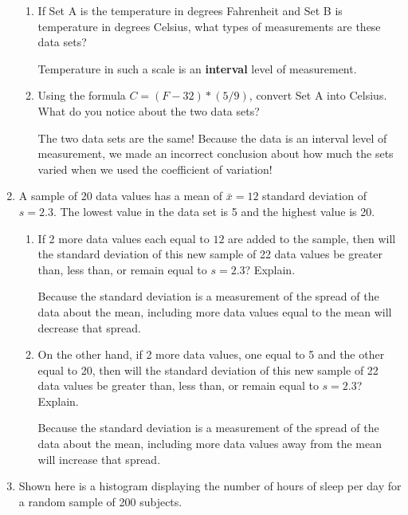 \documentclass{article}
\newcommand{\answer}[1]{\color{white}#1}
\begin{document}
\begin{enumerate}
\begin{enumerate}
    \item If Set A is the temperature in degrees Fahrenheit and Set B is temperature in degrees Celsius, what types of measurements are these data sets?
    
    {\answer Temperature in such a scale is an \textbf{interval} level of measurement.}
    
    \item Using the formula $C = (F-32) * (5/9)$, convert Set A into Celsius. What do you notice about the two data sets?
    
    {\answer The two data sets are the same! Because the data is an interval level of measurement, we made an incorrect conclusion about how much the sets varied when we used the coefficient of variation!}
    \end{enumerate}

\item A sample of 20 data values has a mean of $\bar{x} = 12$ standard deviation of $s = 2.3$. The lowest value in the data set is 5 and the highest value is 20. 
	\begin{enumerate} 
	\item If 2 more data values each equal to $12$ are added to the sample, then will the standard deviation of this new sample of 22 data values be greater than, less than, or remain equal to $s=2.3$? Explain. 

	{\answer{Because the standard deviation is a measurement of the spread of the data about the mean, including more data values equal to the mean will decrease that spread.}} \\

	\item On the other hand, if 2 more data values, one equal to 5 and the other equal to 20, then will the standard deviation of this new sample of 22 data values be greater than, less than, or remain equal to $s=2.3$? Explain. 
	
	{\answer{Because the standard deviation is a measurement of the spread of the data about the mean, including more data values away from the mean will increase that spread.}} \\
	\end{enumerate}

\newpage

\item Shown here is a histogram displaying the number of hours of sleep per day for a random sample of 200 subjects. 


\end{enumerate}
\end{document}
